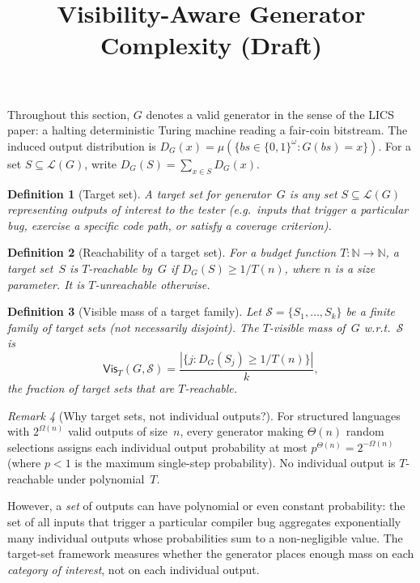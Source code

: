 \documentclass[11pt]{article}
\title{Visibility-Aware Generator Complexity (Draft)}
\author{}
\date{}
\newcommand{\Lang}[1]{\mathcal{L}(#1)}
\newtheorem{definition}{Definition}[section]
\theoremstyle{remark}
\newtheorem{remark}[definition]{Remark}
\theoremstyle{definition}
\begin{document}
\maketitle
\tableofcontents
\bigskip


Throughout this section, $G$ denotes a valid generator in the sense of the
LICS paper: a halting deterministic Turing machine reading a fair-coin
bitstream.  The induced output distribution is
$D_G(x) = \mu(\{bs \in \{0,1\}^\omega : G(bs) = x\})$.
For a set $S \subseteq \Lang{G}$, write $D_G(S) = \sum_{x \in S} D_G(x)$.

\begin{definition}[Target set]\label{def:target-set}
A \emph{target set} for generator~$G$ is any set
$S \subseteq \Lang{G}$ representing outputs of interest to the tester
(e.g.\ inputs that trigger a particular bug, exercise a specific code path,
or satisfy a coverage criterion).
\end{definition}

\begin{definition}[Reachability of a target set]\label{def:reachable}
For a budget function $T : \mathbb{N} \to \mathbb{N}$, a target set~$S$ is
\emph{$T$-reachable} by~$G$ if $D_G(S) \ge 1/T(n)$, where $n$ is a size
parameter.  It is \emph{$T$-unreachable} otherwise.
\end{definition}

\begin{definition}[Visible mass of a target family]\label{def:visible-mass}
Let $\mathcal{S} = \{S_1, \dots, S_k\}$ be a finite family of target sets
(not necessarily disjoint).  The $T$-visible mass of~$G$ w.r.t.\
$\mathcal{S}$ is
\[
  \mathsf{Vis}_T(G, \mathcal{S})
  = \frac{|\{j : D_G(S_j) \ge 1/T(n)\}|}{k},
\]
the fraction of target sets that are $T$-reachable.
\end{definition}

\begin{remark}[Why target sets, not individual outputs?]\label{rem:why-target}
For structured languages with $2^{\Omega(n)}$ valid outputs of size~$n$,
every generator making $\Theta(n)$ random selections assigns each
individual output probability at most $p^{\Theta(n)} = 2^{-\Omega(n)}$
(where $p < 1$ is the maximum single-step probability).
No individual output is $T$-reachable under polynomial~$T$.

However, a \emph{set} of outputs can have polynomial or even constant
probability: the set of all inputs that trigger a particular compiler
bug aggregates exponentially many individual outputs whose probabilities
sum to a non-negligible value.
The target-set framework measures whether the generator places enough
mass on each \emph{category of interest}, not on each individual output.
\end{remark}
\end{document}
